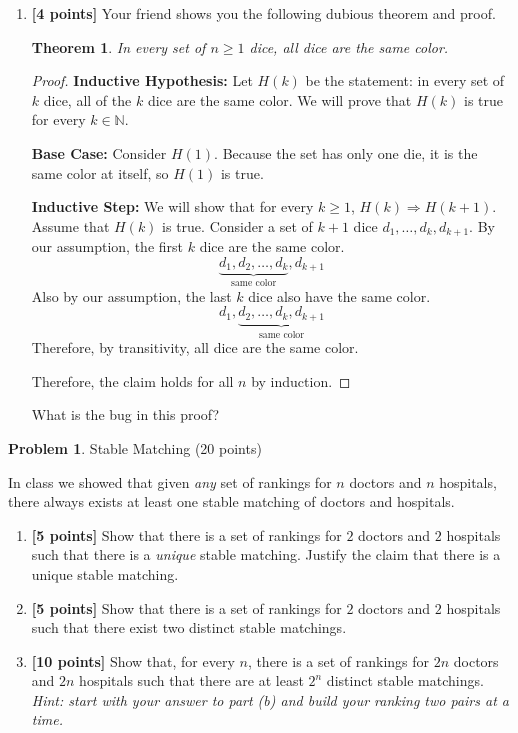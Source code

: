 \documentclass[11pt]{article}
\newcommand{\N}{\mathbb{N}}
\newtheorem{thm}{Theorem}
\theoremstyle{definition}
\theoremstyle{theorem}
\newtheorem{prob}{Problem}
\newcommand{\solution}{\medskip\noindent{\color{DarkBlue}\textbf{Solution:}}}
\begin{document}
\begin{enumerate}[label=(\alph*)]
\item \textbf{[4 points]} Your friend shows you the following dubious theorem and proof.

\begin{thm} In every set of $n \geq 1$ dice, all dice are the same color.   \end{thm}
\begin{proof}

\textbf{Inductive Hypothesis:} Let $H(k)$ be the statement: in every set of $k$ dice, all of the $k$ dice are the same color.  We will prove that $H(k)$ is true for every $k \in \N$.

\noindent \textbf{Base Case:} Consider $H(1)$.  Because the set has only one die, it is the same color at itself, so $H(1)$ is true.

\noindent \textbf{Inductive Step:}  We will show that for every $k \geq 1$, $H(k) \Longrightarrow H(k+1)$. Assume that $H(k)$ is true.  Consider a set of $k+1$ dice $d_1, \ldots, d_k, d_{k+1}$. By our assumption, the first $k$ dice are the same color.
$$\underbrace{d_1, d_2, \ldots, d_k}_\text{same color}, d_{k+1}$$
Also by our assumption, the last $k$ dice also have the same color.
$$d_1,\underbrace{d_2, \ldots, d_k, d_{k+1}}_\text{same color}$$
Therefore, by transitivity, all dice are the same color.

Therefore, the claim holds for all $n$ by induction.
\end{proof}

What is the bug in this proof?

\solution

\end{enumerate}

\newpage
\begin{prob} Stable Matching (20 points) \end{prob}
In class we showed that given \emph{any} set of rankings for $n$ doctors and $n$ hospitals, there always exists at least one stable matching of doctors and hospitals.  

\begin{enumerate}[label=(\alph*)]
\item  \textbf{[5 points]} Show that there is a set of rankings for $2$ doctors and $2$ hospitals such that there is a \emph{unique} stable matching.  Justify the claim that there is a unique stable matching.

\solution

\item  \textbf{[5 points]} Show that there is a set of rankings for $2$ doctors and $2$ hospitals such that there exist two distinct stable matchings.

\solution

\item  \textbf{[10 points]} Show that, for every $n$, there is a set of rankings for $2n$ doctors and $2n$ hospitals such that there are at least $2^n$ distinct stable matchings.  \emph{Hint: start with your answer to part (b) and build your ranking two pairs at a time.}

\solution

\end{enumerate}
\end{document}
